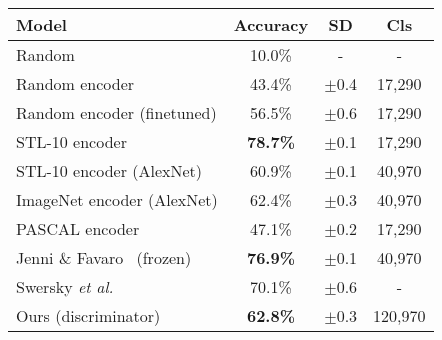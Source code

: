 \documentclass[12pt,a4paper]{article}
\begin{document}
\begin{table}[ht!]
\centering
\begin{tabular}{l c c|c}
\Xhline{0.8pt}
\textbf{Model} & \textbf{Accuracy} & \textbf{SD} & \textbf{Cls}\\
\hline
Random & 10.0\% & - & - \\
Random encoder & 43.4\% & $\pm$0.4 & 17,290 \\ %
Random encoder (finetuned) & 56.5\% & $\pm$0.6 & 17,290 \\ %
\hline
STL-10 encoder & \textbf{78.7\%} & $\pm$0.1 & 17,290 \\ %
STL-10 encoder (AlexNet) & 60.9\% & $\pm$0.1 & 40,970 \\ %
ImageNet encoder (AlexNet) & 62.4\% & $\pm$0.3 & 40,970 \\ %
PASCAL encoder & 47.1\% & $\pm$0.2 & 17,290 \\ %
\hline
Jenni \& Favaro~\cite{SpotArtifacts} (frozen) & \textbf{76.9\%} & $\pm$0.1 & 40,970 \\
Swersky \textit{et al.}~\cite{Stl10TlExp2Comp} & 70.1\% & $\pm$0.6 & - \\
\hline
Ours (discriminator) & \textbf{62.8\%}  & $\pm$0.3 & 120,970 \\ %

\end{tabular}
\end{table}
\end{document}
